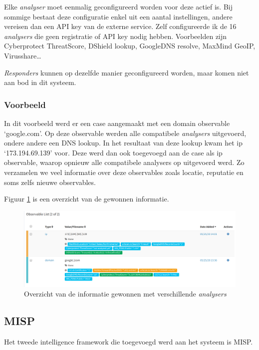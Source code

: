 \documentclass[a4paper,12pt]{report}
\begin{document}
Elke \emph{analyser} moet eenmalig geconfigureerd worden voor deze actief is.
Bij sommige bestaat deze configuratie enkel uit een aantal instellingen, andere vereisen dan een API key van de externe service.
Zelf configureerde ik de 16 \emph{analysers} die geen registratie of API key nodig hebben.
Voorbeelden zijn Cyberprotect ThreatScore, DShield lookup, GoogleDNS resolve, MaxMind GeoIP, Virusshare\dots

\emph{Responders} kunnen op dezelfde manier geconfigureerd worden, maar komen niet aan bod in dit systeem.

\subsubsection{Voorbeeld}
In dit voorbeeld werd er een case aangemaakt met een domain observable `google.com'.
Op deze observable werden alle compatibele \emph{analysers} uitgevoerd, ondere andere een DNS lookup.
In het resultaat van deze lookup kwam het ip `173.194.69.139' voor.
Deze werd dan ook toegevoegd aan de case als ip observable, waarop opnieuw alle compatibele analysers op uitgevoerd werd.
Zo verzamelen we veel informatie over deze observables zoals locatie, reputatie en soms zelfs nieuwe observables.

Figuur \ref{fig:thehive-example} is een overzicht van de gewonnen informatie.

\begin{figure}[H]
  \centering
  \includegraphics[width=\textwidth]{thehive-example}
  \caption{Overzicht van de informatie gewonnen met verschillende \emph{analysers}}
  \label{fig:thehive-example}
\end{figure}

\subsection{MISP}
Het tweede intelligence framework die toegevoegd werd aan het systeem is MISP.
\end{document}
